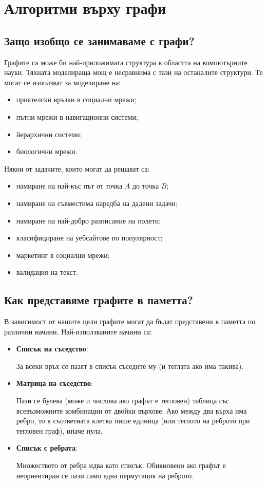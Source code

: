 \chapter{Алгоритми върху графи}

\section{Защо изобщо се занимаваме с графи?}

Графите са може би най-приложимата структура в областта на компютърните науки.
Тяхната моделираща мощ е несравнима с тази на останалите структури.
Те могат се използват за моделиране на:
\begin{itemize}
    \item приятелски връзки в социални мрежи;
    \item пътни мрежи в навигационни системи;
    \item йерархични системи;
    \item биологични мрежи.
\end{itemize}
Някои от задачите, които могат да решават са:
\begin{itemize}
    \item намиране на най-къс път от точка $A$ до точка $B$;
    \item намиране на съвместима наредба на дадени задачи;
    \item намиране на най-добро разписание на полети;
    \item класифициране на уебсайтове по популярност;
    \item маркетинг в социални мрежи;
    \item валидация на текст.
\end{itemize}

\section{Как представяме графите в паметта?}

В зависимост от нашите цели графите могат да бъдат представени в паметта по различни начини.
Най-използваните начини са:
\begin{itemize}
    \item \textbf{Списък на съседство}:

          За всеки връх се пазят в списък съседите му (и теглата ако има такива).
    \item \textbf{Матрица на съседство}:

          Пази се булева (може и числова ако графът е тегловен) таблица със всевъзможните комбинации от двойки върхове.
          Ако между два върха има ребро, то в съответната клетка пише единица (или теглото на реброто при тегловен граф), иначе нула.
    \item \textbf{Списък с ребрата}:

          Множеството от ребра идва като списък. Обикновено ако графът е неориентиран се пази само една пермутация на реброто.
\end{itemize}

